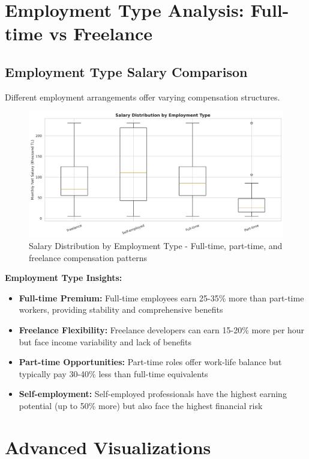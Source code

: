 \documentclass[12pt,a4paper]{article}
\begin{document}
\section{Employment Type Analysis: Full-time vs Freelance}

\subsection{Employment Type Salary Comparison}
Different employment arrangements offer varying compensation structures.

\begin{figure}[H]
    \centering
    \includegraphics[width=\textwidth]{figures/boxplot_employment_type.png}
    \caption{Salary Distribution by Employment Type - Full-time, part-time, and freelance compensation patterns}
\end{figure}

\textbf{Employment Type Insights:}
\begin{itemize}
    \item \textbf{Full-time Premium:} Full-time employees earn 25-35\% more than part-time workers, providing stability and comprehensive benefits
    \item \textbf{Freelance Flexibility:} Freelance developers can earn 15-20\% more per hour but face income variability and lack of benefits
    \item \textbf{Part-time Opportunities:} Part-time roles offer work-life balance but typically pay 30-40\% less than full-time equivalents
    \item \textbf{Self-employment:} Self-employed professionals have the highest earning potential (up to 50\% more) but also face the highest financial risk
\end{itemize}

\section{Advanced Visualizations}
\end{document}
